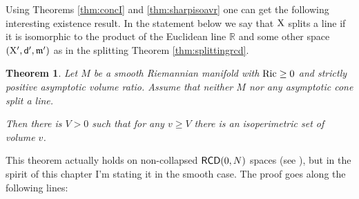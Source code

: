 \documentclass[11pt]{article}
\numberwithin{equation}{section}
\newtheorem{theorem}{Theorem}[section]
\newcommand{\R}{\mathbb{R}}
\newcommand{\X}{{\rm X}}
\newcommand{\sfd}{{\sf d}}
\newcommand{\mm}{{\mathfrak m}}
\newcommand{\RCD}{{\sf RCD}}
\begin{document}
\medskip

Using Theorems \ref{thm:concI} and \ref{thm:sharpisoavr} one can get the following interesting existence result. In the statement below we say that $\X$ splits a line if it is isomorphic to the product of the Euclidean line $\R$ and some other space $(\X',\sfd',\mm')$ as in the splitting Theorem \ref{thm:splittingrcd}.
\begin{theorem}\label{thm:ABFP22}
Let $M$ be a smooth Riemannian manifold with ${\rm Ric}\geq 0$ and strictly positive {asymptotic volume ratio}. Assume that neither $M$ nor any asymptotic cone split a line.

Then there is $V>0$ such that for any $v\geq V$ there is an isoperimetric set of volume $v$.
\end{theorem}
This theorem  actually holds on non-collapsed $\RCD(0,N)$ spaces (see  \cite[Theorem 1.2]{APPS22}), but in the spirit of this chapter I'm stating it in the smooth case. The proof goes along the following lines:
\end{document}
